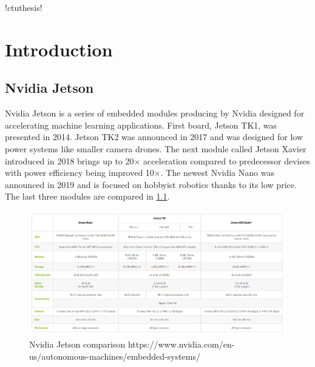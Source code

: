 \documentclass[twoside]{ctuthesis}
\theoremstyle{plain}
\theoremstyle{definition}
\theoremstyle{note}
\begin{document}
\renewcommand \ctulstsep {0pt}

\newcommand\ctuclsname{\leavevmode\unhcopy\ctuclsnamebox}
\newsavebox\ctuclsnamebox
\begin{lrbox}{\ctuclsnamebox}
\ctulst!ctuthesis!
\end{lrbox}

\maketitle

\chapter{Introduction}
\section{Nvidia Jetson}

Nvidia Jetson is a series of embedded modules producing by Nvidia designed for accelerating machine learning applications. First board, Jetson TK1, was presented in 2014. Jetson TK2 was announced in 2017  and was designed for low power systems like smaller camera drones. The next module called Jetson Xavier introduced in 2018 brings up to 20$\times$ acceleration compared to predecessor devises with power efficiency being improved 10$\times$. The newest Nvidia Nano was announced in 2019 and is focused on hobbyist robotics thanks to its low price. The last three modules are compared in \ref{jetson_comparison}.

\begin{figure}[h]
\caption{Nvidia Jetson comparison https://www.nvidia.com/en-us/autonomous-machines/embedded-systems/}
\label{jetson_comparison}
\includegraphics[width=\textwidth]{images/introduction/compare_jetson.png}
\end{figure}
\end{document}
